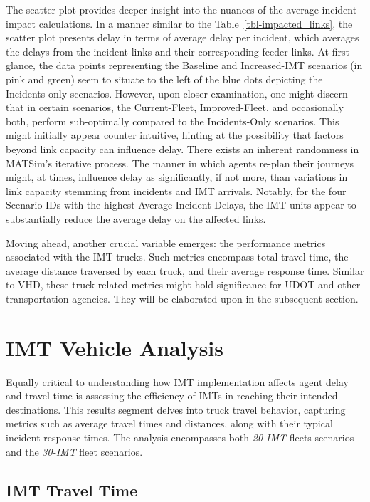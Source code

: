 \documentclass[fancy, oneside, mastersfancy, ms]{byuthesis}
\begin{document}
The scatter plot provides deeper insight into the nuances of the average
incident impact calculations. In a manner similar to the
Table~\ref{tbl-impacted_links}, the scatter plot presents delay in terms
of average delay per incident, which averages the delays from the
incident links and their corresponding feeder links. At first glance,
the data points representing the Baseline and Increased-IMT scenarios
(in pink and green) seem to situate to the left of the blue dots
depicting the Incidents-only scenarios. However, upon closer
examination, one might discern that in certain scenarios, the
Current-Fleet, Improved-Fleet, and occasionally both, perform
sub-optimally compared to the Incidents-Only scenarios. This might
initially appear counter intuitive, hinting at the possibility that
factors beyond link capacity can influence delay. There exists an
inherent randomness in MATSim's iterative process. The manner in which
agents re-plan their journeys might, at times, influence delay as
significantly, if not more, than variations in link capacity stemming
from incidents and IMT arrivals. Notably, for the four Scenario IDs with
the highest Average Incident Delays, the IMT units appear to
substantially reduce the average delay on the affected links.

Moving ahead, another crucial variable emerges: the performance metrics
associated with the IMT trucks. Such metrics encompass total travel
time, the average distance traversed by each truck, and their average
response time. Similar to VHD, these truck-related metrics might hold
significance for UDOT and other transportation agencies. They will be
elaborated upon in the subsequent section.

\hypertarget{imt-vehicle-analysis}{%
\section{IMT Vehicle Analysis}\label{imt-vehicle-analysis}}

Equally critical to understanding how IMT implementation affects agent
delay and travel time is assessing the efficiency of IMTs in reaching
their intended destinations. This results segment delves into truck
travel behavior, capturing metrics such as average travel times and
distances, along with their typical incident response times. The
analysis encompasses both \emph{20-IMT} fleets scenarios and the
\emph{30-IMT} fleet scenarios.

\hypertarget{imt-travel-time}{%
\subsection{IMT Travel Time}\label{imt-travel-time}}
\end{document}
